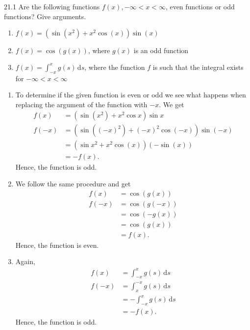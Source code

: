 
\begin{problem}{21.1}
  Are the following functions $f(x), -\infty< x < \infty$, even functions or odd functions?
  Give arguments.

  \begin{enumerate}[label=\alph*)]
    \item $f(x) = \left( \sin \left( x^2 \right) + x^2 \cos (x) \right) \sin (x)$
    \item $f(x) = \cos(g(x))$, where $g(x)$ is an odd function
    \item $f(x) = \int_{-x}^{x} g(s) \, \mathrm{d}s$, where the function $f$ is such that the integral exists for $-\infty < x < \infty$
  \end{enumerate}
\end{problem}

\begin{derivation}
  \begin{enumerate}[label=\alph*)]
    \item To determine if the given function is even or odd we see what happens when replacing the argument of the function with $-x$.
      We get
      \begin{align*}
        f(x) &= \left( \sin \left( x^2 \right) + x^2 \cos x \right) \sin x \\
        f(-x) &= \left( \sin \left( (-x)^2 \right) + (-x)^2 \cos (-x) \right) \sin(-x) \\
        &= \left( \sin x^2 + x^2 \cos (x) \right) (- \sin (x)) \\
        &= -f(x)
      .\end{align*}
      Hence, the function is odd.
    \item We follow the same procedure and get
      \begin{align*}
        f(x) &= \cos (g(x)) \\
        f(-x) &= \cos (g(-x)) \\
        &= \cos (- g (x)) \\
        &= \cos (g(x)) \\
        &= f(x)
      .\end{align*}
      Hence, the function is even.
    \item Again,
      \begin{align*}
        f(x) &= \int_{-x}^{x} g(s) \, \mathrm{d}s \\
        f(-x) &= \int_{x}^{-x} g(s) \, \mathrm{d}s \\
        &= - \int_{-x}^{x} g(s) \, \mathrm{d}s \\
        &= -f(x)
      .\end{align*}
      Hence, the function is odd.
  \end{enumerate}
\end{derivation}

